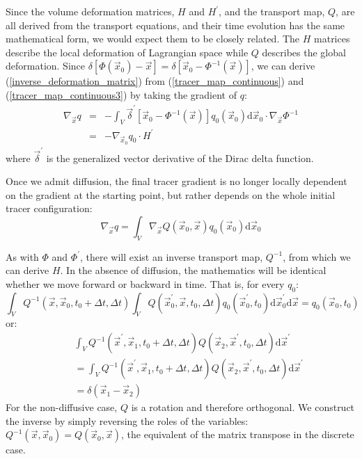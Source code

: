 \documentclass[11pt]{article}
\begin{document}
Since the volume deformation matrices,
$H$ and $H^\prime$, and the transport map, $Q$, are all derived from the
transport equations, and their time evolution has the same mathematical form,
we would expect them to be closely related. 
The $H$ matrices describe the local deformation of Lagrangian space 
while $Q$ describes the global deformation.
Since $\delta \left [\Phi(\vec x_0) - \vec x \right ]=\delta \left [\vec x_0 - \Phi^{-1}(\vec x) \right ]$,
we can derive (\ref{inverse_deformation_matrix}) from
(\ref{tracer_map_continuous}) and (\ref{tracer_map_continuous3}) by taking 
the gradient of $q$:
\begin{eqnarray}
	\nabla_{\vec x} q & = & - \int_V \vec \delta^\prime \left [\vec x_0 - \Phi^{-1}(\vec x) \right ] q_0 (\vec x_0) 
	\mathrm d \vec x_0 \cdot \nabla_{\vec x} \Phi^{-1} \\
	& = & - \nabla_{\vec x_0} q_0 \cdot H^\prime
\end{eqnarray}
where $\vec \delta^\prime$ is the generalized vector derivative of the 
Dirac delta function.

Once we admit diffusion, the final tracer gradient is no longer locally 
dependent on the gradient at the starting point, but rather depends on the
whole initial tracer configuration:
\begin{equation}
	\nabla_{\vec x} q = \int_V \nabla_{\vec x} Q(\vec x_0, \vec x) q_0 (\vec x_0) \mathrm d \vec x_0
\end{equation}

As with $\Phi$ and $\Phi^\prime$, 
there will exist an inverse transport map, $Q^{-1}$, from which we can derive
$H$. In the absence of diffusion, the mathematics will be identical whether
we move forward or backward in time.
That is, for every $q_0$:
\begin{equation}
	\int_V Q^{-1}(\vec x, \vec x_0, t_0+\Delta t, \Delta t) 
	\int_V Q(\vec x_0^\prime, \vec x, t_0, \Delta t) 
	q_0(\vec x_0^\prime, t_0) 
	\mathrm d \vec x_0^\prime \mathrm d \vec x = q_0(\vec x_0, t_0)
\end{equation}
or:
\begin{eqnarray}
	& & \int_V  Q^{-1}(\vec x^\prime, \vec x_1, t_0+\Delta t, \Delta t)
	Q(\vec x_2, \vec x^\prime, t_0, \Delta t) \mathrm d \vec x^\prime \\
	& & = \int_V  Q^{-1}(\vec x^\prime, \vec x_1, t_0+\Delta t, \Delta t)
	Q(\vec x_2, \vec x^\prime, t_0, \Delta t) \mathrm d \vec x^\prime \\ 
	& & = \delta(\vec x_1 - \vec x_2)
\end{eqnarray}
For the non-diffusive case, $Q$ is a rotation and therefore orthogonal.
We construct the inverse by simply reversing the roles of the variables:
$Q^{-1}(\vec x, \vec x_0) = Q(\vec x_0, \vec x)$, 
the equivalent of the matrix transpose in the discrete case.
\end{document}

